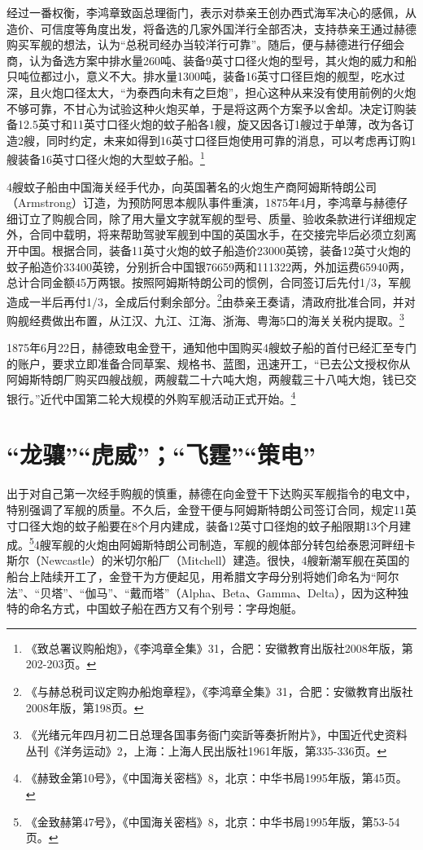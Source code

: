 \documentclass[12pt,UTF8]{ctexbook}
\begin{document}
经过一番权衡，李鸿章致函总理衙门，表示对恭亲王创办西式海军决心的感佩，从造价、可信度等角度出发，将备选的几家外国洋行全部否决，支持恭亲王通过赫德购买军舰的想法，认为“总税司经办当较洋行可靠”。随后，便与赫德进行仔细会商，认为备选方案中排水量260吨、装备9英寸口径火炮的型号，其火炮的威力和船只吨位都过小，意义不大。排水量1300吨，装备16英寸口径巨炮的舰型，吃水过深，且火炮口径太大，“为泰西向未有之巨炮”，担心这种从来没有使用前例的火炮不够可靠，不甘心为试验这种火炮买单，于是将这两个方案予以舍却。决定订购装备12.5英寸和11英寸口径火炮的蚊子船各1艘，旋又因各订1艘过于单薄，改为各订造2艘，同时约定，未来如得到16英寸口径巨炮使用可靠的消息，可以考虑再订购1艘装备16英寸口径火炮的大型蚊子船。\footnote{《致总署议购船炮》，《李鸿章全集》31，合肥：安徽教育出版社2008年版，第202-203页。}

4艘蚊子船由中国海关经手代办，向英国著名的火炮生产商阿姆斯特朗公司（Armstrong）订造，为预防阿思本舰队事件重演，1875年4月，李鸿章与赫德仔细订立了购舰合同，除了用大量文字就军舰的型号、质量、验收条款进行详细规定外，合同中载明，将来帮助驾驶军舰到中国的英国水手，在交接完毕后必须立刻离开中国。根据合同，装备11英寸火炮的蚊子船造价23000英镑，装备12英寸火炮的蚊子船造价33400英镑，分别折合中国银76659两和111322两，外加运费65940两，总计合同金额45万两银。按照阿姆斯特朗公司的惯例，合同签订后先付1/3，军舰造成一半后再付1/3，全成后付剩余部分。\footnote{《与赫总税司议定购办船炮章程》，《李鸿章全集》31，合肥：安徽教育出版社2008年版，第198页。}由恭亲王奏请，清政府批准合同，并对购舰经费做出布置，从江汉、九江、江海、浙海、粤海5口的海关关税内提取。\footnote{《光绪元年四月初二日总理各国事务衙门奕訢等奏折附片》，中国近代史资料丛刊《洋务运动》2，上海：上海人民出版社1961年版，第335-336页。}

1875年6月22日，赫德致电金登干，通知他中国购买4艘蚊子船的首付已经汇至专门的账户，要求立即准备合同草案、规格书、蓝图，迅速开工，“已去公文授权你从阿姆斯特朗厂购买四艘战舰，两艘载二十六吨大炮，两艘载三十八吨大炮，钱已交银行。”近代中国第二轮大规模的外购军舰活动正式开始。\footnote{《赫致金第10号》，《中国海关密档》8，北京：中华书局1995年版，第45页。}

\section{“龙骧”“虎威”；“飞霆”“策电”}

出于对自己第一次经手购舰的慎重，赫德在向金登干下达购买军舰指令的电文中，特别强调了军舰的质量。不久后，金登干便与阿姆斯特朗公司签订合同，规定11英寸口径大炮的蚊子船要在8个月内建成，装备12英寸口径炮的蚊子船限期13个月建成。\footnote{《金致赫第47号》，《中国海关密档》8，北京：中华书局1995年版，第53-54页。}4艘军舰的火炮由阿姆斯特朗公司制造，军舰的舰体部分转包给泰恩河畔纽卡斯尔（Newcastle）的米切尔船厂（Mitchell）建造。很快，4艘新潮军舰在英国的船台上陆续开工了，金登干为方便起见，用希腊文字母分别将她们命名为“阿尔法”、“贝塔”、“伽马”、“戴而塔”（Alpha、Beta、Gamma、Delta），因为这种独特的命名方式，中国蚊子船在西方又有个别号：字母炮艇。
\end{document}
